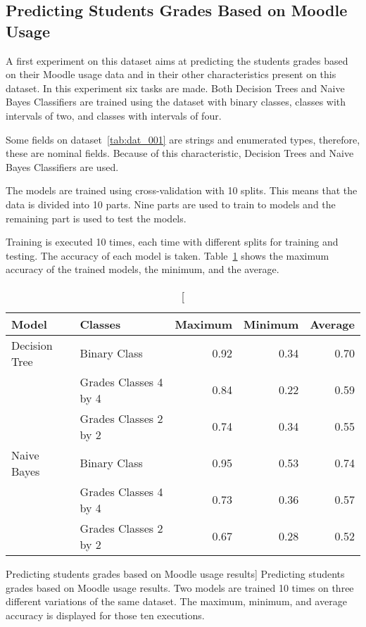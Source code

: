 \subsection{Predicting Students Grades Based on Moodle Usage}
\label{sec:exp_001}

A first experiment on this dataset aims at predicting the students grades based
on their Moodle usage data and in their other characteristics present on this
dataset. In this experiment six tasks are made. Both Decision Trees and Naive
Bayes Classifiers are trained using the dataset with binary classes, classes
with intervals of two, and classes with intervals of four.

Some fields on dataset~\ref{tab:dat_001} are strings and enumerated types,
therefore, these are nominal fields. Because of this characteristic, Decision
Trees and Naive Bayes Classifiers are used.

The models are trained using cross-validation with 10 splits. This means that
the data is divided into 10 parts. Nine parts are used to train to models and
the remaining part is used to test the models.

Training is executed 10 times, each time with different splits for training and
testing. The accuracy of each model is taken. Table~\ref{tab:exp_001_res} shows
the maximum accuracy of the trained models, the minimum, and the average.

\begin{table}[h!]
    \centering

    \begin{tabular}{| l | l | r | r | r |}
        \hline
        \textbf{Model} & \textbf{Classes} & \textbf{Maximum} & \textbf{Minimum} & \textbf{Average} \\ \hline
        Decision Tree & Binary Class          & 0.92 & 0.34 & 0.70 \\
                      & Grades Classes 4 by 4 & 0.84 & 0.22 & 0.59 \\
                      & Grades Classes 2 by 2 & 0.74 & 0.34 & 0.55 \\ \hline
        Naive Bayes   & Binary Class          & 0.95 & 0.53 & 0.74 \\
                      & Grades Classes 4 by 4 & 0.73 & 0.36 & 0.57 \\
                      & Grades Classes 2 by 2 & 0.67 & 0.28 & 0.52 \\ \hline
    \end{tabular}

    \caption
        [Predicting students grades based on Moodle usage results]
        {Predicting students grades based on Moodle usage results. Two models
        are trained 10 times on three different variations of the same dataset.
        The maximum, minimum, and average accuracy is displayed for those ten
        executions.}

    \label{tab:exp_001_res}
\end{table}

